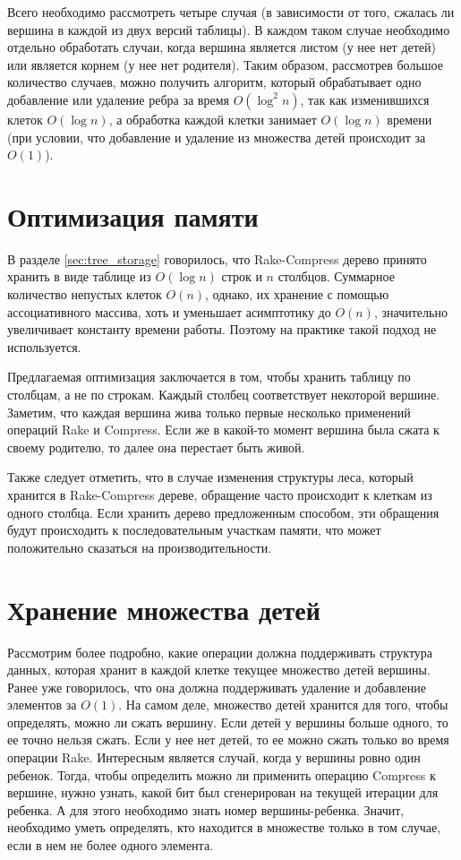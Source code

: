 Всего необходимо рассмотреть четыре случая (в зависимости от того, сжалась ли вершина в каждой из двух версий таблицы). 
В каждом таком случае необходимо отдельно обработать случаи, когда вершина является листом (у нее нет детей) или является корнем (у нее нет родителя).
Таким образом, рассмотрев большое количество случаев, можно получить алгоритм, 
который обрабатывает одно добавление или удаление ребра за время $O(\log^2 n)$, 
так как изменившихся клеток $O(\log n)$, а обработка каждой клетки занимает $O(\log n)$ времени (при условии, что добавление и удаление из множества детей происходит за $O(1)$).
\FloatBarrier
\section{Оптимизация памяти}
\label{sec:memory}

В разделе \ref{sec:tree_storage} говорилось, что Rake-Compress дерево принято хранить в виде таблице из $O(\log n)$ строк и $n$ столбцов. 
Суммарное количество непустых клеток $O(n)$, однако, их хранение с помощью ассоциативного массива, хоть и уменьшает асимптотику до $O(n)$, значительно увеличивает константу времени работы.
Поэтому на практике такой подход не используется. 

Предлагаемая оптимизация заключается в том, чтобы хранить таблицу по столбцам, а не по строкам. Каждый столбец соответствует некоторой вершине.
Заметим, что каждая вершина жива только первые несколько применений операций Rake и Compress. Если же в какой-то момент вершина была сжата к своему родителю, то далее она перестает быть живой.

Также следует отметить, что в случае изменения структуры леса, который хранится в Rake-Compress дереве, обращение часто происходит к клеткам из одного столбца. 
Если хранить дерево предложенным способом, эти обращения будут происходить к последовательным участкам памяти, что может положительно сказаться на производительности.

\FloatBarrier
\section{Хранение множества детей}
\label{sec:set_storage}

Рассмотрим более подробно, какие операции должна поддерживать структура данных, которая хранит в каждой клетке текущее множество детей вершины.
Ранее уже говорилось, что она должна поддерживать удаление и добавление элементов за $O(1)$. 
На самом деле, множество детей хранится для того, чтобы определять, можно ли сжать вершину. Если детей у вершины больше одного, то ее точно нельзя сжать.
Если у нее нет детей, то ее можно сжать только во время операции Rake. Интересным является случай, когда у вершины ровно один ребенок. Тогда, чтобы определить 
можно ли применить операцию Compress к вершине, нужно узнать, какой бит был сгенерирован на текущей итерации для ребенка. А для этого необходимо знать номер вершины-ребенка.
Значит, необходимо уметь определять, кто находится в множестве только в том случае, если в нем не более одного элемента.

